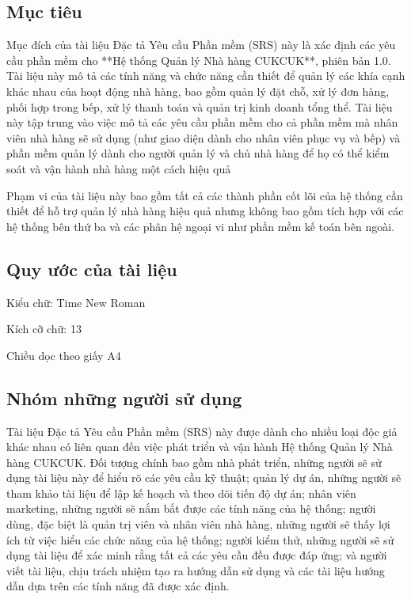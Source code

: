 {}
\setcounter{section}{1}

\subsection{Mục tiêu}
Mục đích của tài liệu Đặc tả Yêu cầu Phần mềm (SRS) này là xác định các yêu cầu phần mềm cho **Hệ thống Quản lý Nhà hàng CUKCUK**, phiên bản 1.0. Tài liệu này mô tả các tính năng và chức năng cần thiết để quản lý các khía cạnh khác nhau của hoạt động nhà hàng, bao gồm quản lý đặt chỗ, xử lý đơn hàng, phối hợp trong bếp, xử lý thanh toán và quản trị kinh doanh tổng thể. Tài liệu này tập trung vào việc mô tả các yêu cầu phần mềm cho cả phần mềm mà nhân viên nhà hàng sẽ sử dụng (như giao diện dành cho nhân viên phục vụ và bếp) và phần mềm quản lý dành cho người quản lý và chủ nhà hàng để họ có thể kiểm soát và vận hành nhà hàng một cách hiệu quả

Phạm vi của tài liệu này bao gồm tất cả các thành phần cốt lõi của hệ thống cần thiết để hỗ trợ quản lý nhà hàng hiệu quả nhưng không bao gồm tích hợp với các hệ thống bên thứ ba và các phân hệ ngoại vi như phần mềm kế toán bên ngoài.

\subsection{Quy ước của tài liệu}
Kiểu chữ: Time New Roman

Kích cỡ chữ: 13

Chiều dọc theo giấy A4


\subsection{Nhóm những người sử dụng}
Tài liệu Đặc tả Yêu cầu Phần mềm (SRS) này được dành cho nhiều loại độc giả khác nhau có liên quan đến việc phát triển và vận hành Hệ thống Quản lý Nhà hàng CUKCUK. Đối tượng chính bao gồm nhà phát triển, những người sẽ sử dụng tài liệu này để hiểu rõ các yêu cầu kỹ thuật; quản lý dự án, những người sẽ tham khảo tài liệu để lập kế hoạch và theo dõi tiến độ dự án; nhân viên marketing, những người sẽ nắm bắt được các tính năng của hệ thống; người dùng, đặc biệt là quản trị viên và nhân viên nhà hàng, những người sẽ thấy lợi ích từ việc hiểu các chức năng của hệ thống; người kiểm thử, những người sẽ sử dụng tài liệu để xác minh rằng tất cả các yêu cầu đều được đáp ứng; và người viết tài liệu, chịu trách nhiệm tạo ra hướng dẫn sử dụng và các tài liệu hướng dẫn dựa trên các tính năng đã được xác định.

